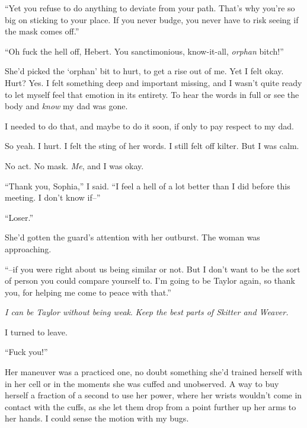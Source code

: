 ``Yet you refuse to do anything to deviate from your path.  That's why you're so big on sticking to your place.  If you never budge, you never have to risk seeing if the mask comes off.''



``Oh fuck the hell off, Hebert.  You sanctimonious, know-it-all, \emph{orphan} bitch!''



She'd picked the `orphan' bit to hurt, to get a rise out of me.  Yet I felt okay.  Hurt?  Yes.  I felt something deep and important missing, and I wasn't quite ready to let myself feel that emotion in its entirety.  To hear the words in full or see the body and \emph{know} my dad was gone.



I needed to do that, and maybe to do it soon, if only to pay respect to my dad.



So yeah.  I hurt.  I felt the sting of her words.  I still felt off kilter.  But I was calm.



No act.  No mask.  \emph{Me}, and I was okay.



``Thank you, Sophia,'' I said.  ``I feel a hell of a lot better than I did before this meeting.  I don't know if--''



``Loser.''



She'd gotten the guard's attention with her outburst.  The woman was approaching.



``--if you were right about us being similar or not.  But I don't want to be the sort of person you could compare yourself to.  I'm going to be Taylor again, so thank you, for helping me come to peace with that.''



\emph{I can be Taylor without being weak}.  \emph{Keep the best parts of Skitter and Weaver.}



I turned to leave.



``Fuck you!''



Her maneuver was a practiced one, no doubt something she'd trained herself with in her cell or in the moments she was cuffed and unobserved.  A way to buy herself a fraction of a second to use her power, where her wrists wouldn't come in contact with the cuffs, as she let them drop from a point further up her arms to her hands.  I could sense the motion with my bugs.



